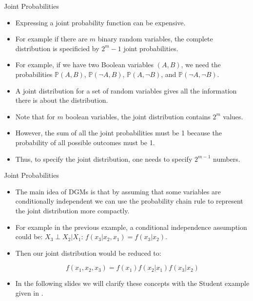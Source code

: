 \documentclass[handout]{beamer}
\begin{document}
\begin{frame}{Joint Probabilities}
\scriptsize{
\begin{itemize}

\item Expressing a joint probability function can be expensive.

\item For example if there are $m$ binary random variables, the complete distribution is specificied by $2^{m}-1$ joint probabilities.

\item For example, if we have two Boolean variables $(A,B)$, we need the probabilities $\mathbb{P}(A,B)$, $\mathbb{P}(\neg A,B)$, $\mathbb{P}(A,\neg B)$, and $\mathbb{P}(\neg A, \neg B)$.

\item A joint distribution for a set of random variables gives all the information there is about the distribution.


\item Note that for $m$ boolean variables, the joint distribution contains $2^m$ values. 

\item However, the sum of all the joint probabilities must be 1 because the probability of all possible outcomes must be 1. 

\item Thus, to specify the joint distribution, one needs to specify $2^{m-1}$ numbers.


\end{itemize}



} 

\end{frame}


\begin{frame}{Joint Probabilities}
\scriptsize{
\begin{itemize}



\item The main idea of DGMs is that by assuming that some variables are conditionally independent we can use the probability chain rule to represent the joint distribution more compactly.

\item For example in the previous example, a conditional independence assumption could be: $X_3 \perp X_2| X_1$: $f(x_3|x_2,x_1)= f(x_3|x_2)$.

\item Then our joint distribution would be reduced to:

\begin{displaymath}
f(x_1,x_2,x_3)=f(x_1)f(x_2|x_1)f(x_3|x_2)
 \end{displaymath}

 
\item In the following slides we will clarify these concepts with the Student example given in \cite{koller2009probabilistic}. 

\end{itemize}



} 

\end{frame}
\end{document}
